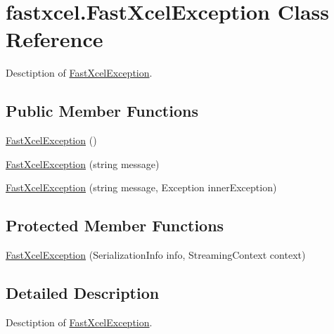 \hypertarget{classfastxcel_1_1_fast_xcel_exception}{
\section{fastxcel.FastXcelException Class Reference}
\label{classfastxcel_1_1_fast_xcel_exception}
}


Desctiption of \hyperlink{classfastxcel_1_1_fast_xcel_exception}{FastXcelException}.  


\subsection*{Public Member Functions}
\begin{DoxyCompactItemize}
\item 
\hyperlink{classfastxcel_1_1_fast_xcel_exception_a20a980f15e0e67833958ba3f981cf207}{FastXcelException} ()
\item 
\hyperlink{classfastxcel_1_1_fast_xcel_exception_ace27d2fe92cb2b853398d661dd3e67ad}{FastXcelException} (string message)
\item 
\hyperlink{classfastxcel_1_1_fast_xcel_exception_a6e690f4a307c4eae023391d8e232b973}{FastXcelException} (string message, Exception innerException)
\end{DoxyCompactItemize}
\subsection*{Protected Member Functions}
\begin{DoxyCompactItemize}
\item 
\hyperlink{classfastxcel_1_1_fast_xcel_exception_acb14a96311304657322df8b290b35238}{FastXcelException} (SerializationInfo info, StreamingContext context)
\end{DoxyCompactItemize}


\subsection{Detailed Description}
Desctiption of \hyperlink{classfastxcel_1_1_fast_xcel_exception}{FastXcelException}. 

